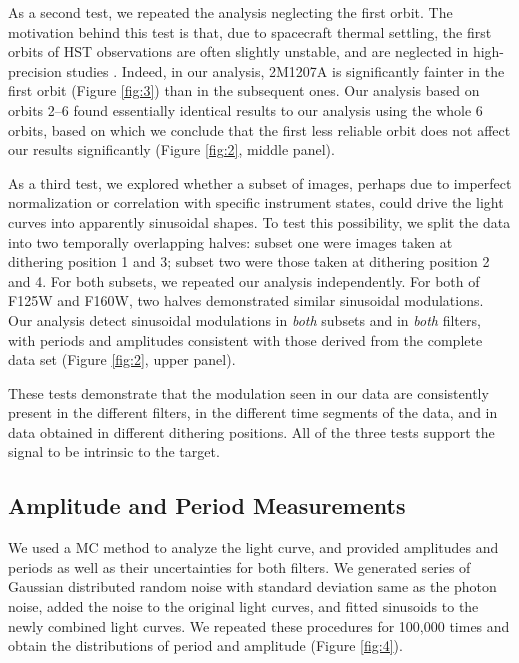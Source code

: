 \documentclass[apj]{emulateapj}
\begin{document}
As a second test, we repeated the analysis neglecting the first
orbit. The motivation behind this test is that, due to spacecraft
thermal settling, the first orbits of HST observations are often
slightly unstable, and are neglected in high-precision studies
\citep[e.g.][]{Mandell2013}. Indeed, in our analysis, 2M1207A is
significantly fainter in the first orbit (Figure \ref{fig:3}) than in
the subsequent ones.  Our analysis based on orbits 2--6 found
essentially identical results to our analysis using the whole 6 orbits, based on
which we conclude that the first less reliable orbit does not affect
our results significantly (Figure \ref{fig:2}, middle panel).

As a third test, we explored whether a subset of images, perhaps due to
imperfect normalization or correlation with specific instrument states,
could drive the light curves into apparently sinusoidal shapes. To
test this possibility, we split the data into two temporally
overlapping halves: subset one were images taken at dithering position
1 and 3; subset two were those taken at dithering position 2 and
4. For both subsets, we repeated our analysis independently.  For both
of F125W and F160W, two halves demonstrated similar sinusoidal
modulations.  Our analysis detect sinusoidal modulations in {\em both}
subsets and in {\em both} filters, with periods and amplitudes
consistent with those derived from the complete data set (Figure
\ref{fig:2}, upper panel).
 
 These tests demonstrate that the modulation seen in our data are
 consistently present in the different filters, in the different time
 segments of the data, and in data obtained in different dithering
 positions. All of the three tests support the signal to be
 intrinsic to the target. 
 

\subsection{Amplitude and Period Measurements}

We used a MC method to analyze the light curve, and provided amplitudes
and periods as well as their uncertainties for both filters. We
generated series of Gaussian distributed random noise with standard deviation
same as the photon noise, added the noise to the original light curves, and
fitted sinusoids to the newly combined light curves. We repeated these
procedures  for 100,000 times and obtain the distributions of period
and amplitude (Figure \ref{fig:4}).
\end{document}

